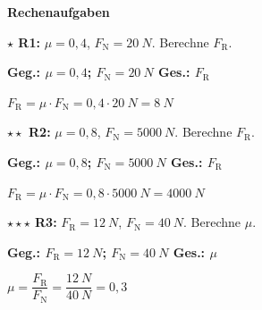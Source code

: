 \documentclass[11pt,a4paper]{article}
\newcommand{\aufgabe}[1]{\noindent\textbf{\textcolor{fachfarbe}{#1}}}
\newcommand{\lsg}[1]{\textcolor{loesung}{\textbf{#1}}}
\newcommand{\stern}[1]{\textcolor{merkerand}{\textbf{#1}}}
\begin{document}
\aufgabe{Rechenaufgaben}

\vspace{0.3em}
\textbf{\stern{$\star$} R1:} $\mu = 0{,}4$, $F_\text{N} = \SI{20}{N}$. Berechne $F_\text{R}$.

\lsg{Geg.: $\mu = 0{,}4$; $F_\text{N} = \SI{20}{N}$ \quad Ges.: $F_\text{R}$}

\lsg{$F_\text{R} = \mu \cdot F_\text{N} = 0{,}4 \cdot \SI{20}{N} = \SI{8}{N}$}

\vspace{0.3em}
\textbf{\stern{$\star\star$} R2:} $\mu = 0{,}8$, $F_\text{N} = \SI{5000}{N}$. Berechne $F_\text{R}$.

\lsg{Geg.: $\mu = 0{,}8$; $F_\text{N} = \SI{5000}{N}$ \quad Ges.: $F_\text{R}$}

\lsg{$F_\text{R} = \mu \cdot F_\text{N} = 0{,}8 \cdot \SI{5000}{N} = \SI{4000}{N}$}

\vspace{0.3em}
\textbf{\stern{$\star\star\star$} R3:} $F_\text{R} = \SI{12}{N}$, $F_\text{N} = \SI{40}{N}$. Berechne $\mu$.

\lsg{Geg.: $F_\text{R} = \SI{12}{N}$; $F_\text{N} = \SI{40}{N}$ \quad Ges.: $\mu$}

\lsg{$\mu = \dfrac{F_\text{R}}{F_\text{N}} = \dfrac{\SI{12}{N}}{\SI{40}{N}} = 0{,}3$}

\vspace{0.4em}

\newpage
\end{document}
